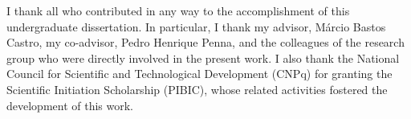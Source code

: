 
\begin{agradecimentos}
	I thank all who contributed in any way to the accomplishment of this
	undergraduate dissertation. In particular, I thank my advisor,
	Márcio Bastos Castro, my co-advisor, Pedro Henrique Penna, and the
	colleagues of the research group who were directly involved in the
	present work. I also thank the National Council for Scientific and
	Technological Development (CNPq) for granting the Scientific Initiation
	Scholarship (PIBIC), whose related activities fostered the development
	of this work.
\end{agradecimentos}

